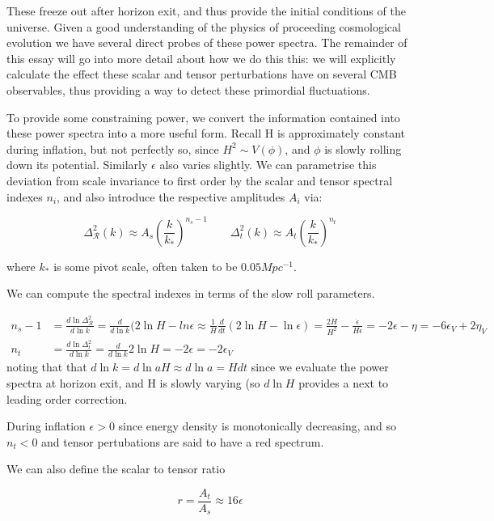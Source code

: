 \documentclass[a4paper,11pt]{article}
\begin{document}
These freeze out after horizon exit, and thus provide the initial conditions of the universe. Given a good understanding of the physics of proceeding cosmological evolution we have several direct probes of these power spectra. The remainder of this essay will go into more detail about how we do this this: we will explicitly calculate the effect these scalar and tensor perturbations have on several CMB observables, thus providing a way to detect these primordial fluctuations.

To provide some constraining power, we convert the information contained into these power spectra into a more useful form. Recall H is approximately constant during inflation, but not perfectly so, since $H^2 \sim V(\phi)$, and $\phi$ is slowly rolling down its potential. Similarly $\epsilon$ also varies slightly. We can parametrise this deviation from scale invariance to first order by the scalar and tensor spectral indexes $n_i$, and also introduce the respective amplitudes $A_i$ via:

\begin{equation}
\Delta^2_{\mathcal{R}}(k) \approx A_s(\frac{k}{k_*})^{n_s-1} \qquad
\Delta^2_t(k) \approx A_t(\frac{k}{k_*})^{n_t}
\end{equation}

where $k_*$ is some pivot scale, often taken to be $0.05Mpc^{-1}$.

We can compute the spectral indexes in terms of the slow roll parameters. 

\begin{align}
n_s-1 &= \frac{d\ln{\Delta^2_{\mathcal{R}}}}{d\ln{k}} = \frac{d}{d\ln{k}}(2\ln{H}-ln{\epsilon} \approx \frac{1}{H}\frac{d}{dt}(2\ln{H}-\ln{\epsilon}) = \frac{2\dot{H}}{H^2}-\frac{\dot{\epsilon}}{H\epsilon} = -2\epsilon-\eta = -6\epsilon_V+2\eta_V\\
n_t &= \frac{d\ln{\Delta^2_t}}{d\ln{k}} = \frac{d}{d\ln{k}}2\ln{H}=-2\epsilon=-2\epsilon_V
\end{align}
noting that that $d\ln{k} = d\ln{aH} \approx d\ln{a} = Hdt$ since we evaluate the power spectra 
at horizon exit, and H is slowly varying (so $d\ln{H}$ provides a next to leading order correction.


During inflation $\epsilon>0$ since energy density is monotonically decreasing, and so $n_t<0$ and tensor pertubations are said to have a red spectrum.

We can also define the scalar to tensor ratio 

\begin{equation}
r=\frac{A_t}{A_s} \approx 16\epsilon
\end{equation}
\end{document}
